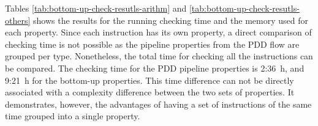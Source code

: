 Tables \ref{tab:bottom-up-check-resutls-arithm} and \ref{tab:bottom-up-check-resutls-others} shows the results for the running checking time and the memory used for each property. Since each instruction has its own property, a direct comparison of checking time is not possible as the pipeline properties from the PDD flow are grouped per type. Nonetheless, the total time for checking all the instructions can be compared. The checking time for the PDD pipeline properties is 2:36~h, and 9:21~h for the bottom-up properties. This time difference can not be directly associated with a complexity difference between the two sets of properties. It demonstrates, however, the advantages of having a set of instructions of the same time grouped into a single property.